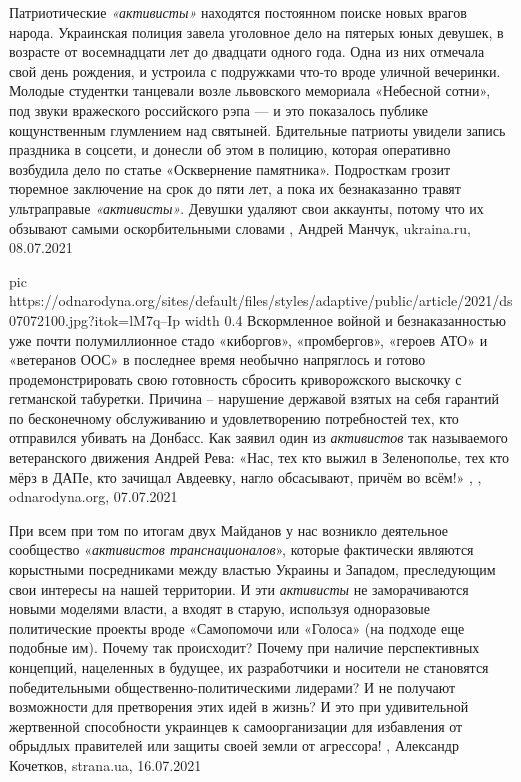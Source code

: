 Патриотические \emph{«активисты»} находятся постоянном поиске новых врагов
народа.  Украинская полиция завела уголовное дело на пятерых юных девушек, в
возрасте от восемнадцати лет до двадцати одного года. Одна из них отмечала свой
день рождения, и устроила с подружками что-то вроде уличной вечеринки. Молодые
студентки танцевали возле львовского мемориала «Небесной сотни», под звуки
вражеского российского рэпа — и это показалось публике кощунственным глумлением
над святыней.  Бдительные патриоты увидели запись праздника в соцсети, и
донесли об этом в полицию, которая оперативно возбудила дело по статье
«Осквернение памятника».  Подросткам грозит тюремное заключение на срок до пяти
лет, а пока их безнаказанно травят ультраправые \emph{«активисты»}. Девушки удаляют
свои аккаунты, потому что их обзывают самыми оскорбительными словами
, 
Андрей Манчук, ukraina.ru, 08.07.2021

\ifcmt
  pic https://odnarodyna.org/sites/default/files/styles/adaptive/public/article/2021/ds07072100.jpg?itok=lM7q--Ip
	width 0.4
\fi
Вскормленное войной и безнаказанностью уже почти полумиллионное стадо
«киборгов», «промбергов», «героев АТО» и «ветеранов ООС» в последнее время
необычно напряглось и готово продемонстрировать свою готовность сбросить
криворожского выскочку с гетманской табуретки. Причина – нарушение державой
взятых на себя гарантий по бесконечному обслуживанию и удовлетворению
потребностей тех, кто отправился убивать на Донбасс. Как заявил один из
\emph{активистов} так называемого ветеранского движения Андрей Рева: «Нас, тех
кто выжил в Зеленополье, тех кто мёрз в ДАПе, кто зачищал Авдеевку, нагло
обсасывают, причём во всём!»
, , odnarodyna.org,
07.07.2021

При всем при том по итогам двух Майданов у нас возникло деятельное сообщество
«\emph{активистов транснационалов}», которые фактически являются корыстными
посредниками между властью Украины и Западом, преследующим свои интересы на
нашей территории. И эти \emph{активисты} не заморачиваются новыми моделями власти, а
входят в старую, используя одноразовые политические проекты вроде «Самопомочи
или «Голоса» (на подходе еще подобные им).
Почему так происходит? Почему при наличие перспективных концепций, нацеленных в
будущее, их разработчики и носители не становятся победительными
общественно-политическими лидерами? И не получают возможности для претворения
этих идей в жизнь? И это при удивительной жертвенной способности украинцев к
самоорганизации для избавления от обрыдлых правителей или защиты своей земли от
агрессора!
, 
Александр Кочетков, strana.ua, 16.07.2021

